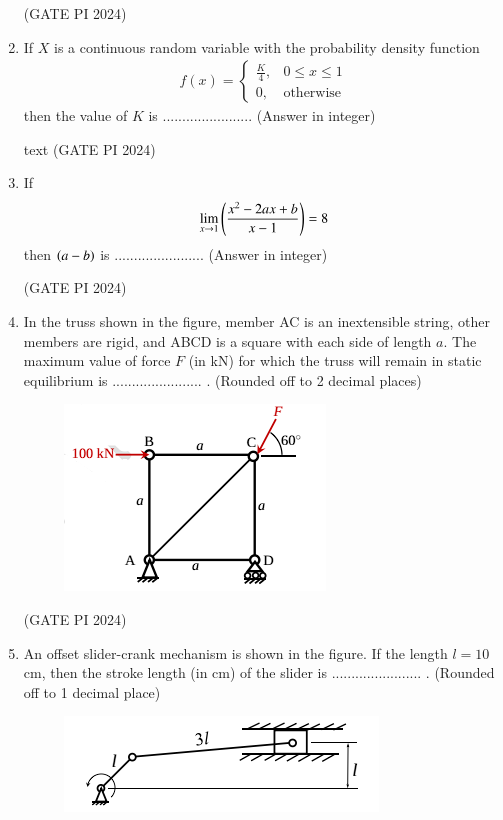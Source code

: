 \documentclass[journal,12pt,onecolumn]{IEEEtran}
\theoremstyle{remark}
\begin{document}
\begin{enumerate}
\hfill (GATE PI 2024)

\item If $X$ is a continuous random variable with the probability density function
\begin{align*}
f(x) = 
\begin{cases}
\frac{K}{4}, & 0 \leq x \leq 1 \\
0, & \text{otherwise}
\end{cases}
\end{align*}
then the value of $K$ is ....................... (Answer in integer)

text
\hfill (GATE PI 2024)

\item If
\begin{align*}
\lim_{x \to 1} \left( \dfrac{x^2 - 2ax + b}{x-1} \right) = 8 
\end{align*}
then $\left(a-b\right)$ is ....................... (Answer in integer)

\hfill (GATE PI 2024)

\item In the truss shown in the figure, member AC is an inextensible string, other members are rigid, and ABCD is a square with each side of length $a$. The maximum value of force $F$ (in kN) for which the truss will remain in static equilibrium is ....................... . (Rounded off to 2 decimal places)

\begin{figure}[H]
\centering
\includegraphics[width=0.5\columnwidth]{fig7.png}
\caption{}
\end{figure}

\hfill (GATE PI 2024)

\item An offset slider-crank mechanism is shown in the figure. If the length $l=10$ cm, then the stroke length (in cm) of the slider is ....................... . (Rounded off to 1 decimal place)

\begin{figure}[H]
\centering
\includegraphics[width=0.5\columnwidth]{fig8.png}
\caption{}
\end{figure}


\end{enumerate}
\end{document}
